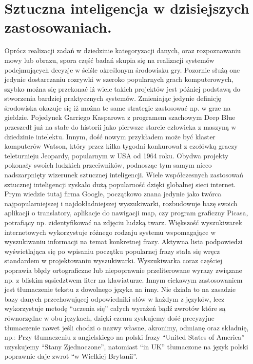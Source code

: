 \section{Sztuczna inteligencja w dzisiejszych zastosowaniach.}
\begin{par}
Oprócz realizacji zadań w dziedzinie kategoryzacji danych, oraz rozpoznawaniu mowy lub obrazu, spora część badań skupia się na realizacji systemów podejmujących decyzje w ściśle określonym środowisku gry.
Pozornie służą one jedynie dostarczaniu rozrywki w szeroko popularnych grach komputerowych, szybko można się przekonać iż wiele takich projektów jest później podstawą do stworzenia bardziej praktycznych systemów. Zmieniając jedynie definicję środowiska okazuje się iż można te same strategie zastosować np. w grze na giełdzie.
Pojedynek Garriego Kasparowa z programem szachowym Deep Blue przeszedł już na stałe do historii jako pierwsze starcie człowieka z maszyną w dziedzinie intelektu. 
Innym, dość nowym przykładem może być klaster komputerów Watson, który przez kilka tygodni konkurował z czołówką graczy teleturnieju Jeopardy, popularnym w USA od 1964 roku.
Obydwa projekty pokonały swoich ludzkich przeciwników, podnosząc tym samym nieco nadszarpnięty wizerunek sztucznej inteligencji.
Wiele współczesnych zastosowań sztucznej inteligencji zyskało dużą popularność dzięki globalnej sieci internet.
Prym wiedzie tutaj firma Google, początkowo znana jedynie jako twórca najpopularniejszej i najdokładniejszej wyszukiwarki, rozbudowuje bazę swoich aplikacji o translatory,
aplikacje do nawigacji map, czy program graficzny Picasa, potrafiący np. zidentyfikować na zdjęciu ludzką twarz.
Większość wyszukiwarek internetowych wykorzystuje różnego rodzaju systemu wspomagające w wyszukiwaniu informacji na temat konkretnej frazy.
Aktywna lista podpowiedzi wyświetlająca się po wpisaniu początku popularnej frazy stała się wręcz standardem w projektowaniu wyszukiwarki.
Wyszukiwarka coraz częściej poprawia błędy ortograficzne lub niepoprawnie przeliterowane wyrazy związane np. z bliskim sąsiedztwem liter na klawiaturze.
Innym ciekawym zastosowaniem jest tłumaczenie tekstu z dowolnego języka na inny.
Nie działa to na zasadzie bazy danych przechowującej odpowiedniki słów w każdym z języków, lecz wykorzystuje metodę ``uczenia się'' całych wyrażeń bądź zwrotów które są równorzędne w obu językach, 
dzięki czemu zyskujemy dość precyzyjne tłumaczenie nawet jeśli chodzi o nazwy własne, akronimy, odmianę oraz składnię, np.: Przy tłumaczeniu z angielskiego na polski frazy ``United States of America'' uzyskujemy ``Stany Zjednoczone'', natomiast ``in UK'' tłumaczone na język polski poprawnie daje zwrot ``w Wielkiej Brytanii''.

\end{par}
